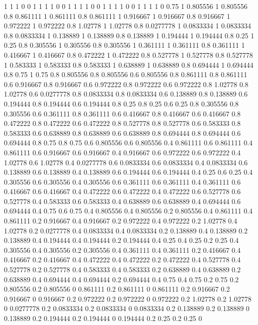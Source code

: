 1 1
1 0
0 1
1 1
1 0
0 1
1 1
1 0
0 1
1 1
1 0
0 1
1 1
1 0
0.75 1
0.805556 1
0.805556 0.8
0.861111 1
0.861111 0.8
0.861111 1
0.916667 1
0.916667 0.8
0.916667 1
0.972222 1
0.972222 0.8
1.02778 1
1.02778 0.8
0.0277778 1
0.0833334 1
0.0833334 0.8
0.0833334 1
0.138889 1
0.138889 0.8
0.138889 1
0.194444 1
0.194444 0.8
0.25 1
0.25 0.8
0.305556 1
0.305556 0.8
0.305556 1
0.361111 1
0.361111 0.8
0.361111 1
0.416667 1
0.416667 0.8
0.472222 1
0.472222 0.8
0.527778 1
0.527778 0.8
0.527778 1
0.583333 1
0.583333 0.8
0.583333 1
0.638889 1
0.638889 0.8
0.694444 1
0.694444 0.8
0.75 1
0.75 0.8
0.805556 0.8
0.805556 0.6
0.805556 0.8
0.861111 0.8
0.861111 0.6
0.916667 0.8
0.916667 0.6
0.972222 0.8
0.972222 0.6
0.972222 0.8
1.02778 0.8
1.02778 0.6
0.0277778 0.8
0.0833334 0.8
0.0833334 0.6
0.138889 0.8
0.138889 0.6
0.194444 0.8
0.194444 0.6
0.194444 0.8
0.25 0.8
0.25 0.6
0.25 0.8
0.305556 0.8
0.305556 0.6
0.361111 0.8
0.361111 0.6
0.416667 0.8
0.416667 0.6
0.416667 0.8
0.472222 0.8
0.472222 0.6
0.472222 0.8
0.527778 0.8
0.527778 0.6
0.583333 0.8
0.583333 0.6
0.638889 0.8
0.638889 0.6
0.638889 0.8
0.694444 0.8
0.694444 0.6
0.694444 0.8
0.75 0.8
0.75 0.6
0.805556 0.6
0.805556 0.4
0.861111 0.6
0.861111 0.4
0.861111 0.6
0.916667 0.6
0.916667 0.4
0.916667 0.6
0.972222 0.6
0.972222 0.4
1.02778 0.6
1.02778 0.4
0.0277778 0.6
0.0833334 0.6
0.0833334 0.4
0.0833334 0.6
0.138889 0.6
0.138889 0.4
0.138889 0.6
0.194444 0.6
0.194444 0.4
0.25 0.6
0.25 0.4
0.305556 0.6
0.305556 0.4
0.305556 0.6
0.361111 0.6
0.361111 0.4
0.361111 0.6
0.416667 0.6
0.416667 0.4
0.472222 0.6
0.472222 0.4
0.472222 0.6
0.527778 0.6
0.527778 0.4
0.583333 0.6
0.583333 0.4
0.638889 0.6
0.638889 0.4
0.694444 0.6
0.694444 0.4
0.75 0.6
0.75 0.4
0.805556 0.4
0.805556 0.2
0.805556 0.4
0.861111 0.4
0.861111 0.2
0.916667 0.4
0.916667 0.2
0.972222 0.4
0.972222 0.2
1.02778 0.4
1.02778 0.2
0.0277778 0.4
0.0833334 0.4
0.0833334 0.2
0.138889 0.4
0.138889 0.2
0.138889 0.4
0.194444 0.4
0.194444 0.2
0.194444 0.4
0.25 0.4
0.25 0.2
0.25 0.4
0.305556 0.4
0.305556 0.2
0.305556 0.4
0.361111 0.4
0.361111 0.2
0.416667 0.4
0.416667 0.2
0.416667 0.4
0.472222 0.4
0.472222 0.2
0.472222 0.4
0.527778 0.4
0.527778 0.2
0.527778 0.4
0.583333 0.4
0.583333 0.2
0.638889 0.4
0.638889 0.2
0.638889 0.4
0.694444 0.4
0.694444 0.2
0.694444 0.4
0.75 0.4
0.75 0.2
0.75 0.2
0.805556 0.2
0.805556 0
0.861111 0.2
0.861111 0
0.861111 0.2
0.916667 0.2
0.916667 0
0.916667 0.2
0.972222 0.2
0.972222 0
0.972222 0.2
1.02778 0.2
1.02778 0
0.0277778 0.2
0.0833334 0.2
0.0833334 0
0.0833334 0.2
0.138889 0.2
0.138889 0
0.138889 0.2
0.194444 0.2
0.194444 0
0.194444 0.2
0.25 0.2
0.25 0

